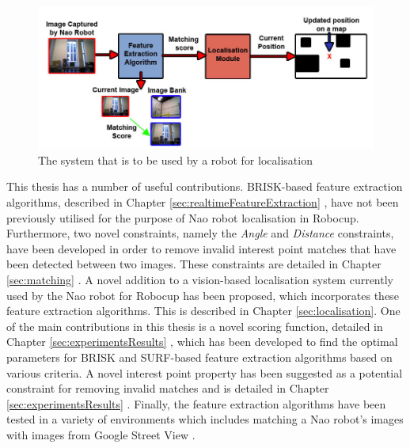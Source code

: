\begin{figure}[h!] 
  \centering
    \includegraphics[width=1.0\textwidth]{../Drawings/introduction/Full_system.jpg}
    \caption{The system that is to be used by a robot for localisation}
    \label{fig:system}
\end{figure}

This thesis has a number of useful contributions. BRISK-based feature extraction algorithms, described in Chapter \ref{sec:realtimeFeatureExtraction} , have not been previously utilised for the purpose of Nao robot localisation in Robocup. Furthermore, two novel constraints, namely the \textit{Angle} and \textit{Distance} constraints, have been developed in order to remove invalid interest point matches that have been detected between two images. These constraints are detailed in Chapter \ref{sec:matching} . A novel addition to a vision-based localisation system currently used by the Nao robot for Robocup has been proposed, which incorporates these feature extraction algorithms. This is described in Chapter \ref{sec:localisation}. One of the main contributions in this thesis is a novel scoring function, detailed in Chapter \ref{sec:experimentsResults} , which has been developed to find the optimal parameters for BRISK and SURF-based feature extraction algorithms based on various criteria. A novel interest point property has been suggested as a potential constraint for removing invalid matches and is detailed in Chapter \ref{sec:experimentsResults} . Finally, the feature extraction algorithms have been tested in a variety of environments which includes matching a Nao robot's images with images from Google Street View \cite{StreetView}.\\

